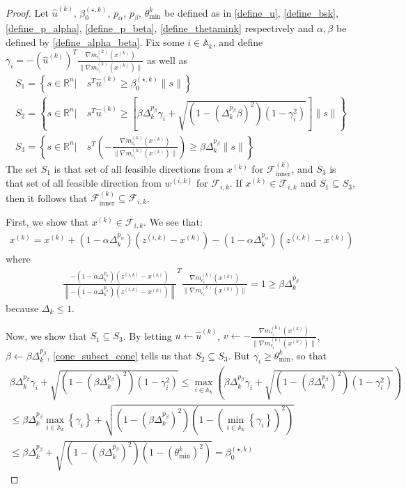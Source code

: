 \documentclass{article}
\theoremstyle{case}
\numberwithin{theorem}{subsection}
\newcommand{\activeconstraintsk}{{\mathbb A_{k}}}
\newcommand{\bsk}{{\beta_0^{(\star, k)}}}
\newcommand{\dk}{\Delta_k}
\newcommand{\fcki}{{\mathcal {F}^{(k)}_{\textrm{inner}}}}
\newcommand{\fik}{{\mathcal F_{i, k}}}
\newcommand{\gmcik}{{\nabla m_{c_i}^{(k)}\left(\xk\right)}}
\newcommand{\hgik}{{\frac{\nabla m^{(k)}_{c_i}(\xk)}{\|\nabla m^{(k)}_{c_i}(\xk)\|}}}
\newcommand{\huk}{{{\hat u}^{(k)}}}
\newcommand{\Rn}{\mathbb R^n}
\newcommand{\thetamink}{{\theta^k_{\textrm{min}}}}
\newcommand{\wik}{{w^{(i, k)}}}
\newcommand{\xk}{{x^{(k)}}}
\newcommand{\zik}{{z^{(i, k)}}}
\begin{document}
\begin{proof}
Let 
$\huk$, $\bsk$, $p_{\alpha}$, $p_{\beta}$, $\thetamink$
be defined as in
\cref{define_u}, \cref{define_bsk}, \cref{define_p_alpha}, \cref{define_p_beta}, \cref{define_thetamink}
respectively and $\alpha, \beta$ be defined by \cref{define_alpha_beta}.
Fix some $i \in \activeconstraintsk$, and define $\gamma_i = -\left(\huk\right)^T\hgik$ as well as
\begin{align*}
S_1 = \left\{s\in\Rn | \quad s^T\huk\ge\bsk\|s\| \right\} \\
S_2 = \left\{s\in\Rn | \quad s^T\huk\ge\left[\beta\dk^{p_{\beta}}\gamma_i + \sqrt{(1 - \left(\dk^{p_{\beta}}\beta\right)^2)\left(1 - \gamma_i^2\right)}\right]\|s\| \right\} \\
S_3 = \left\{s\in\Rn | \quad s^T\left(-\hgik\right)\ge\beta\dk^{p_{\beta}}\|s\| \right\}
\end{align*}
The set $S_1$ is that set of all feasible directions from $\xk$ for $\fcki$, and $S_3$ is that set of all feasible direction from $\wik$ for $\fik$.
If $\xk \in \fik$ and $S_1 \subseteq S_3$, then it follows that $\fcki \subseteq \fik$.

First, we show that $\xk \in \fik$.
We see that:
\begin{align*}
\xk = \xk + \left(1 - \alpha\dk^{p_{\alpha} }\right)(\zik - \xk) - \left(1 - \alpha\dk^{p_{\alpha} }\right)(\zik - \xk)
\end{align*}
where
\begin{align*}
\frac{-\left(1 - \alpha\dk^{p_{\alpha} }\right)(\zik - \xk)}{\left\|-\left(1 - \alpha\dk^{p_{\alpha} }\right)(\zik - \xk)\right\|}^T\hgik = 1 \ge \beta \dk^{p_{\beta}}
\end{align*}
because $\dk \le 1$.

Now, we show that $S_1 \subseteq S_3$.
By letting $u \gets \huk$, $v \gets -\hgik$, $\beta \gets \beta \dk^{p_{\beta}}$, \cref{cone_subset_cone} tells us that
$S_2 \subseteq S_3$.
But $\gamma_i \ge \thetamink$, so that
\begin{align*}
\beta\dk^{p_{\beta}}\gamma_i + \sqrt{\left(1 - \left(\beta\dk^{p_{\beta}}\right)^2\right)\left(1 - \gamma_i^2\right)}
\le \max_{i\in\activeconstraintsk} \left(\beta\dk^{p_{\beta}}\gamma_i + \sqrt{\left(1 - \left(\beta\dk^{p_{\beta}}\right)^2\right)\left(1 - \gamma_i^2\right)}\right) \\
\le \beta\dk^{p_{\beta}} \max_{i\in\activeconstraintsk}\left\{\gamma_i\right\} + \sqrt{\left(1 - \left(\beta\dk^{p_{\beta}}\right)^2\right)\left(1 - \left(\min_{i\in\activeconstraintsk}\left\{\gamma_i\right\}\right)^2\right)} \\
\le \beta\dk^{p_{\beta}} + \sqrt{\left(1 - \left(\beta\dk^{p_{\beta}}\right)^2\right)\left(1 - \left(\thetamink\right)^2\right)} = \bsk
\end{align*}


\end{proof}
\end{document}
